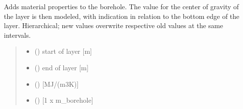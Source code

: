 \documentclass[letterpaper,10pt,english]{sphinxmanual}
\begin{document}
\begin{fulllineitems}
\begin{fulllineitems}
\end{fulllineitems}


\begin{fulllineitems}
\label{\detokenize{tscw_module:tscw_module.tscw_DataClassesInput.GacaFieldData.add_materialProperty}}
\pysigstartsignatures
{}
\pysigstopsignatures
\sphinxAtStartPar
Adds material properties to the borehole.
The value for the center of gravity of the layer is then modeled, with indication in relation to the bottom edge of the layer. 
Hierarchical; new values overwrite respective old values at the same intervals.
\begin{quote}\begin{description}
\begin{itemize}
\item {} 
\sphinxAtStartPar
{} () \textendash{} start of layer {[}m{]}

\item {} 
\sphinxAtStartPar
{} () \textendash{} end of layer {[}m{]}

\item {} 
\sphinxAtStartPar
{} (\sphinxstyleliteralemphasis{\sphinxupquote{ {[}}}\sphinxstyleliteralemphasis{\sphinxupquote{{]}}}) \textendash{} {[}MJ/(m3K){]}

\item {} 
\sphinxAtStartPar
{} (\sphinxstyleliteralemphasis{\sphinxupquote{{[}}}\sphinxstyleliteralemphasis{\sphinxupquote{(}}\sphinxstyleliteralemphasis{\sphinxupquote{)}}\sphinxstyleliteralemphasis{\sphinxupquote{{]}}}) \textendash{} {[}1 x m\_borehole{]}


\end{itemize}
\end{description}
\end{quote}
\end{fulllineitems}
\end{fulllineitems}
\end{document}
